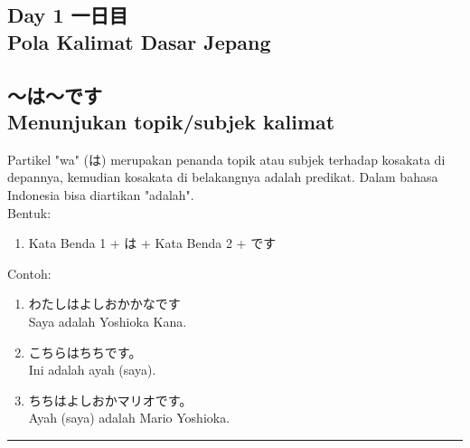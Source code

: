 \begin{flushright}
    \section*{\Large{Day 1 一日目 \\
    Pola Kalimat Dasar Jepang}}
\end{flushright}

\subsection*{
    ～は～です \\ 
    Menunjukan topik/subjek kalimat
}
Partikel "wa" (は) merupakan penanda topik atau subjek terhadap kosakata di depannya, kemudian
kosakata di belakangnya adalah predikat. Dalam bahasa Indonesia bisa diartikan "adalah".\\
Bentuk:
\begin{enumerate}
    \item Kata Benda 1 + は + Kata Benda 2 + です
\end{enumerate}
Contoh: 
\begin{enumerate}
    \item わたしはよしおかかなです
    \\ Saya adalah Yoshioka Kana.
    \item こちらはちちです。
    \\ Ini adalah ayah (saya).
    \item ちちはよしおかマリオです。
    \\ Ayah (saya) adalah Mario Yoshioka.
\end{enumerate}

\vspace{0.2cm}\hrule height 1pt\vspace{0.2cm}


